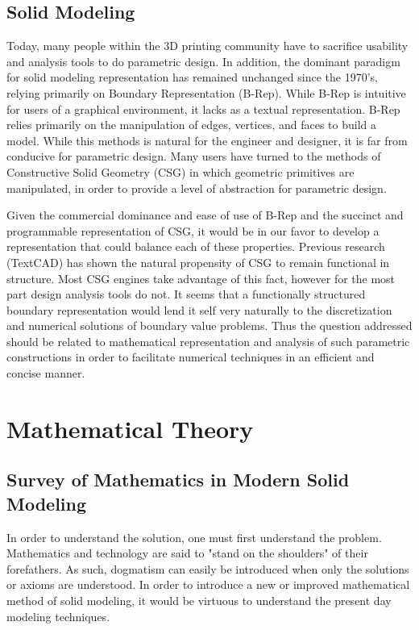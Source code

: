 \documentclass[a4paper]{article}
\begin{document}
\subsection{Solid Modeling}
Today, many people within the 3D printing community have to sacrifice usability and analysis tools to do parametric design. In addition, the dominant paradigm for solid modeling representation has remained unchanged since the 1970's, relying primarily on Boundary Representation (B-Rep). While B-Rep is intuitive for users of a graphical environment, it lacks as a textual representation. B-Rep relies primarily on the manipulation of edges, vertices, and faces to build a model. While this methods is natural for the engineer and designer, it is far from conducive for parametric design. Many users have turned to the methods of Constructive Solid Geometry (CSG) in which geometric primitives are manipulated, in order to provide a level of abstraction for parametric design. 

Given the commercial dominance and ease of use of B-Rep and the succinct and programmable representation of CSG, it would be in our favor to develop a representation that could balance each of these properties. Previous research (TextCAD) has shown the natural propensity of CSG to remain functional in structure. Most CSG engines take advantage of this fact, however for the most part design analysis tools do not. It seems that a functionally structured boundary representation would lend it self very naturally to the discretization and numerical solutions of boundary value problems. Thus the question addressed should be related to mathematical representation and analysis of such parametric constructions in order to facilitate numerical techniques in an efficient and concise manner.  


\section{Mathematical Theory}
\subsection{Survey of Mathematics in Modern Solid Modeling}
In order to understand the solution, one must first understand the problem. Mathematics and technology are said to "stand on the shoulders" of their forefathers. As such, dogmatism can easily be introduced when only the solutions or axioms are understood. In order to introduce a new or improved mathematical method of solid modeling, it would be virtuous to understand the present day modeling techniques.
\end{document}
